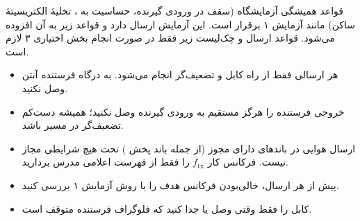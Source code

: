 \documentclass[a4paper,11pt]{article}
\begin{document}

قواعد همیشگی آزمایشگاه (سقف
در ورودی گیرنده، حساسیت به
،
تخلیهٔ الکتریسیتهٔ ساکن) مانند آزمایش ۱ برقرار است. این آزمایش ارسال دارد و قواعد زیر به آن افزوده می‌شود. قواعد ارسال و چک‌لیست زیر فقط در صورت انجام بخش اختیاری ۳ لازم است.

\begin{safetybox}
\begin{itemize}
\item هر ارسالی فقط از راه کابل و تضعیف‌گر انجام می‌شود. به درگاه فرستنده آنتن وصل نکنید.
\item خروجی فرستنده را هرگز مستقیم به ورودی گیرنده وصل نکنید؛ همیشه دست‌کم تضعیف‌گر
در مسیر باشد.
\item ارسال هوایی در باندهای دارای مجوز (از جمله باند پخش
)
تحت هیچ شرایطی مجاز نیست. فرکانس کار
$f_{\mathrm{tx}}$
را فقط از فهرست اعلامی مدرس بردارید.
\item پیش از هر ارسال، خالی‌بودن فرکانس هدف را با روش آزمایش ۱ بررسی کنید.
\item کابل
را فقط وقتی وصل یا جدا کنید که فلوگراف فرستنده متوقف است.
\end{itemize}
\end{safetybox}
\end{document}
